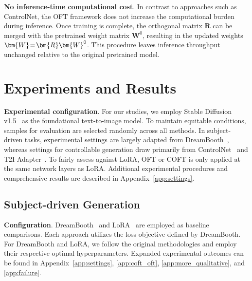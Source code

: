\textbf{No inference-time computational cost}. In contrast to approaches such as ControlNet, the OFT framework does not increase the computational burden during inference. Once training is complete, the orthogonal matrix $\bm{R}$ can be merged with the pretrained weight matrix $\bm{W}^0$, resulting in the updated weights $\thickmuskip=2mu \medmuskip=2mu \bm{W}=\bm{R}\bm{W}^0$. This procedure leaves inference throughput unchanged relative to the original pretrained model.

\section{Experiments and Results}

\textbf{Experimental configuration}. For our studies, we employ Stable Diffusion v1.5~\cite{rombach2022high} as the foundational text-to-image model. To maintain equitable conditions, samples for evaluation are selected randomly across all methods. In subject-driven tasks, experimental settings are largely adapted from DreamBooth~\cite{ruiz2023dreambooth}, whereas settings for controllable generation draw primarily from ControlNet~\cite{zhang2023adding} and T2I-Adapter~\cite{mou2023t2i}. To fairly assess against LoRA, OFT or COFT is only applied at the same network layers as LoRA. Additional experimental procedures and comprehensive results are described in Appendix~\ref{app:settings}.

\subsection{Subject-driven Generation}

\textbf{Configuration}. DreamBooth~\cite{ruiz2023dreambooth} and LoRA~\cite{hulora2022} are employed as baseline comparisons. Each approach utilizes the loss objective defined by DreamBooth. For DreamBooth and LoRA, we follow the original methodologies and employ their respective optimal hyperparameters. Expanded experimental outcomes can be found in Appendix~\ref{app:settings}, \ref{app:coft_oft}, \ref{app:more_qualitative}, and \ref{app:failure}.

